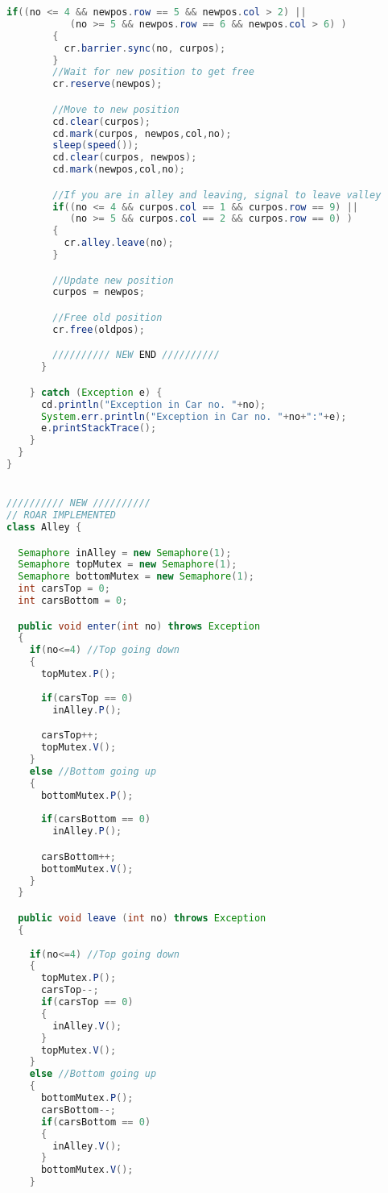 \begin{lstlisting}[language=java]
        if((no <= 4 && newpos.row == 5 && newpos.col > 2) ||
           (no >= 5 && newpos.row == 6 && newpos.col > 6) )
        {
          cr.barrier.sync(no, curpos);
        }
        //Wait for new position to get free
        cr.reserve(newpos);

        //Move to new position
        cd.clear(curpos);
        cd.mark(curpos, newpos,col,no);
        sleep(speed());
        cd.clear(curpos, newpos);
        cd.mark(newpos,col,no);

        //If you are in alley and leaving, signal to leave valley
        if((no <= 4 && curpos.col == 1 && curpos.row == 9) ||
           (no >= 5 && curpos.col == 2 && curpos.row == 0) )
        {
          cr.alley.leave(no);
        }

        //Update new position
        curpos = newpos;

        //Free old position
        cr.free(oldpos);

        ////////// NEW END //////////
      }

    } catch (Exception e) {
      cd.println("Exception in Car no. "+no);
      System.err.println("Exception in Car no. "+no+":"+e);
      e.printStackTrace();
    }
  }
}


////////// NEW //////////
// ROAR IMPLEMENTED
class Alley {

  Semaphore inAlley = new Semaphore(1);
  Semaphore topMutex = new Semaphore(1);
  Semaphore bottomMutex = new Semaphore(1);
  int carsTop = 0;
  int carsBottom = 0;

  public void enter(int no) throws Exception
  {
    if(no<=4) //Top going down
    {
      topMutex.P();
      
      if(carsTop == 0)
        inAlley.P();

      carsTop++;
      topMutex.V();
    }
    else //Bottom going up
    { 
      bottomMutex.P();
      
      if(carsBottom == 0)
        inAlley.P();

      carsBottom++;
      bottomMutex.V();
    }
  }

  public void leave (int no) throws Exception
  {
  
    if(no<=4) //Top going down
    {
      topMutex.P();
      carsTop--;
      if(carsTop == 0)
      {
        inAlley.V();
      }
      topMutex.V();
    }
    else //Bottom going up
    { 
      bottomMutex.P();
      carsBottom--;
      if(carsBottom == 0)
      {
        inAlley.V();
      }
      bottomMutex.V();
    }
    

\end{lstlisting}
